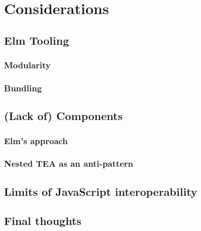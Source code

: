 \chapter{Considerations}

\section{Elm Tooling}
\subsection{Modularity}
\subsection{Bundling}
\section{(Lack of) Components}
\subsection{Elm's approach}
\subsection{Nested TEA as an anti-pattern}
\section{Limits of JavaScript interoperability}
\section{Final thoughts}
